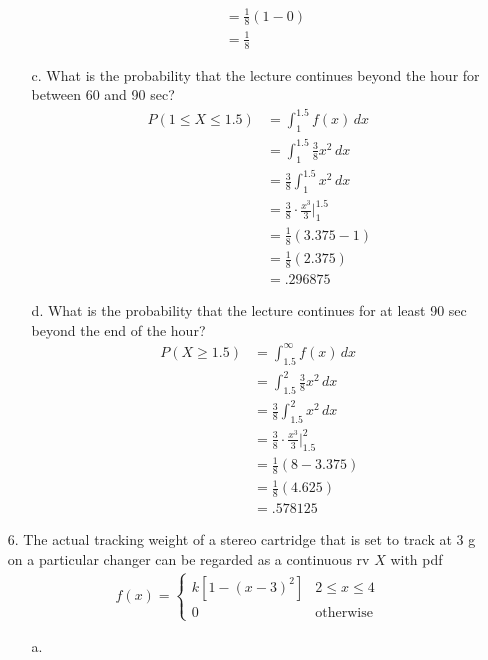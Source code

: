 \documentclass[letterpaper,12pt]{article}
\begin{document}
\begin{enumerate}
\begin{enumerate}
\begin{align*}
          &= \frac{1}{8}(1 - 0) \\
          &= \frac{1}{8}
        \end{align*}
      \item[c.]
        What is the probability that the lecture continues beyond the hour for between 60 and 90 sec?
        \begin{align*}
          P(1 \le X \le 1.5) &= \int_{1}^{1.5} f(x)\,dx \\
          &= \int_{1}^{1.5} \frac{3}{8}x^2\,dx \\
          &= \frac{3}{8} \int_{1}^{1.5} x^2\,dx \\
          &= \frac{3}{8} \cdot \frac{x^3}{3}\bigg\rvert_{1}^{1.5} \\
          &= \frac{1}{8}(3.375 - 1) \\
          &= \frac{1}{8}(2.375) \\
          &= .296875
        \end{align*}
      \item[d.]
        What is the probability that the lecture continues for at least 90 sec beyond the end of the hour?
        \begin{align*}
          P(X \ge 1.5) &= \int_{1.5}^{\infty} f(x)\,dx \\
          &= \int_{1.5}^{2} \frac{3}{8}x^2\,dx \\
          &= \frac{3}{8} \int_{1.5}^{2} x^2\,dx \\
          &= \frac{3}{8} \cdot \frac{x^3}{3}\bigg\rvert_{1.5}^{2} \\
          &= \frac{1}{8}(8 - 3.375) \\
          &= \frac{1}{8}(4.625) \\
          &= .578125
        \end{align*}
    \end{enumerate}
  \item[6.]
    The actual tracking weight of a stereo cartridge that is set to track at 3 g on a particular changer can be regarded as a continuous rv $X$ with pdf
    \begin{align*}
      f(x) = \begin{cases}
        k[1 - (x - 3)^2] & 2 \le x \le 4 \\
        0                & \text{otherwise}
      \end{cases}
    \end{align*}
    \begin{enumerate}
      \item[a.]

\end{enumerate}
\end{enumerate}
\end{document}
